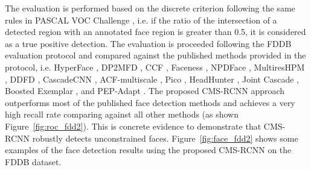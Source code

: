 \documentclass[10pt,journal,cspaper,compsoc]{IEEEtran}
\begin{document}
The evaluation is performed based on the discrete criterion following the same rules in PASCAL VOC Challenge \cite{everingham2010pascal}, i.e. if the ratio of the intersection of a detected region with an annotated face region is greater than 0.5, it is considered as a true positive detection. The evaluation is proceeded following the FDDB evaluation protocol and compared against the published methods provided in the protocol, i.e. HyperFace \cite{ranjan2016hyperface}, DP2MFD \cite{ranjan2015dp2mfd}, CCF \cite{yang2015ccf}, Faceness \cite{yang2015faceness}, NPDFace \cite{liao2014npdface}, MultiresHPM \cite{ghiasi2015multireshpm}, DDFD \cite{farfade2015ddfd}, CascadeCNN \cite{li2015cascadecnn}, ACF-multiscale \cite{yang2014acf-multiscale}, Pico \cite{markuvs2013pico}, HeadHunter \cite{mathias2014face}, Joint Cascade \cite{chen2014jointcascade}, Boosted Exemplar \cite{li2014exemplar}, and PEP-Adapt \cite{li2013pep-adapt}. The proposed CMS-RCNN approach outperforms most of the published face detection methods and achieves a very high recall rate comparing against all other methods (as shown Figure~\ref{fig:roc_fdd2}). This is concrete evidence to demonstrate that CMS-RCNN robustly detects unconstrained faces. Figure~\ref{fig:face_fdd2} shows some examples of the face detection results using the proposed CMS-RCNN on the FDDB dataset.
\end{document}
